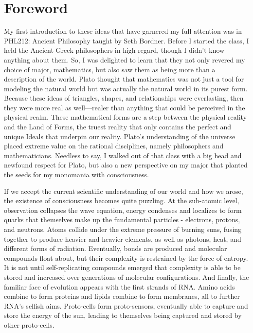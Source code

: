 \documentclass[12pt, AofM.tex]{subfiles}
\begin{document}
\section{Foreword}
My first introduction to these ideas that have garnered my full attention was in PHL212: Ancient Philosophy taught by Seth Bordner. Before I started the class, I held the Ancient Greek philosophers in high regard, though I didn't know anything about them. So, I was delighted to learn that they not only revered my choice of major, mathematics, but also saw them as being more than a description of the world. Plato thought that mathematics was not just a tool for modeling the natural world but was actually the natural world in its purest form. Because these ideas of triangles, shapes, and relationships were everlasting, then they were more real as well—realer than anything that could be perceived in the physical realm. These mathematical forms are a step between the physical reality and the Land of Forms, the truest reality that only contains the perfect and unique Ideals that underpin our reality. Plato's understanding of the universe placed extreme value on the rational disciplines, namely philosophers and mathematicians. Needless to say, I walked out of that class with a big head and newfound respect for Plato, but also a new perspective on my major that planted the seeds for my monomania with consciousness.

If we accept the current scientific understanding of our world and how we arose, the existence of consciousness becomes quite puzzling. At the sub-atomic level, observation collapses the wave equation, energy condenses and localizes to form quarks that themselves make up the fundamental particles - electrons, protons, and neutrons. Atoms collide under the extreme pressure of burning suns, fusing together to produce heavier and heavier elements, as well as photons, heat, and different forms of radiation. Eventually, bonds are produced and molecular compounds float about, but their complexity is restrained by the force of entropy. It is not until self-replicating compounds emerged that complexity is able to be stored and increased over generations of molecular configurations. And finally, the familiar face of evolution appears with the first strands of RNA. Amino acids combine to form proteins and lipids combine to form membranes, all to further RNA's selfish aims. Proto-cells form proto-sensors, eventually able to capture and store the energy of the sun, leading to themselves being captured and stored by other proto-cells.
\end{document}
